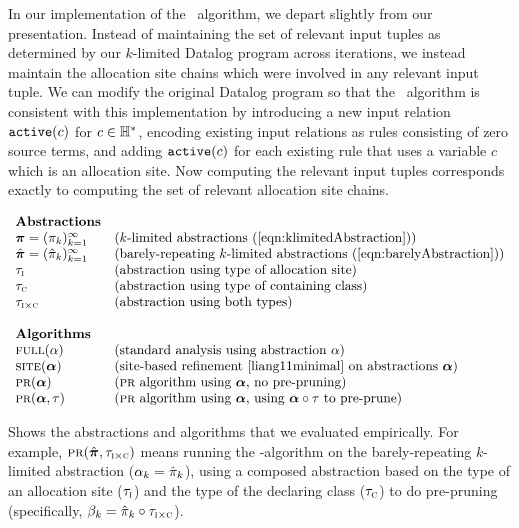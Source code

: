 In our implementation of the \PR\ algorithm, we depart slightly from our
presentation.  Instead of maintaining the set of relevant input tuples as
determined by our $k$-limited Datalog program across iterations, we instead
maintain the allocation site chains which were involved in any relevant input
tuple.  We can modify the original Datalog program so that the \PR\ algorithm
is consistent with this implementation by introducing a new input relation
$\text{\tt active}(c)$ for $c \in {\mathbb H}^*$, encoding existing input relations as rules
consisting of zero source terms, and adding $\text{\tt active}(c)$ for each existing
rule that uses a variable $c$ which is an allocation site.  Now computing the
relevant input tuples corresponds exactly to computing the set of relevant
allocation site chains.

\begin{table}
\[
\begin{array}{ll}
\text{\bf Abstractions} \\
\Klimabs = (\klimabs_k)_{k=1}^\infty   & \defn{$k$-limited abstractions \refeqn{klimitedAbstraction}} \\
\Klimdabs = (\klimdabs_k)_{k=1}^\infty & \defn{barely-repeating $k$-limited abstractions \refeqn{barelyAbstraction}} \\
\hclassIs                              & \defn{abstraction using type of allocation site} \\
\hclassHas                             & \defn{abstraction using type of containing class} \\
\hclassIsHas                           & \defn{abstraction using both types} \\
\\
\text{\bf Algorithms} \\
\Full(\alpha)         & \defn{standard analysis using abstraction $\alpha$} \\
\Site(\balpha)        & \defn{site-based refinement \cite{liang11minimal} on abstractions $\balpha$} \\
\PR(\balpha)          & \defn{\PR\ algorithm using $\balpha$, no pre-pruning} \\
\PR(\balpha,\hclass)  & \defn{\PR\ algorithm using $\balpha$, using $\balpha\circ\hclass$ to pre-prune} \\
\end{array}
\]
\caption{\label{tab:algorithms} Shows the abstractions and algorithms that we evaluated empirically.
For example,
$\text{\sc pr}(\hat{\mbox{\boldmath$\pi$}},\tau_{\text{\sc i} \times \text{\sc c}})$
means running the \PR-algorithm on the barely-repeating $k$-limited abstraction ($\alpha_k = \hat{\pi}_k$),
using a composed abstraction based on the type of an allocation site ($\tau_{\text{\sc i}}$) 
and the type of the declaring class ($\tau_{\text{\sc c}}$) to do pre-pruning
(specifically, $\beta_k = \hat{\pi}_k \circ \tau_{\text{\sc i} \times \text{\sc c}}$).
}
\end{table}

